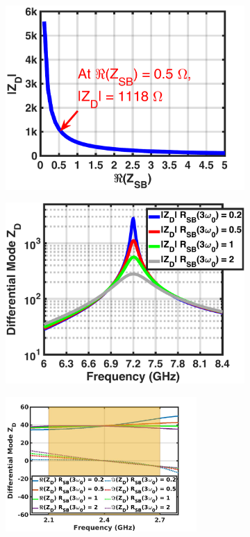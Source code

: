\documentclass[conference]{IEEEtran}
\begin{document}
\begin{figure}[!t]
\captionsetup{font=footnotesize}
\centering
\begin{subfigure}{0.24\textwidth}
\includegraphics[width=1\textwidth]{Images/Design/Design_A_Zn_3H.pdf}
\caption{}
\label{fig:Design_A_Zn_3H}
\end{subfigure}
\begin{subfigure}{0.24\textwidth}
\includegraphics[width=1\textwidth]{Images/Design/Design_A_Rn_var_3H.pdf}
\caption{}
\label{fig:Design_A_Rn_var_3H}
\end{subfigure}
\begin{subfigure}{0.5\textwidth}
\centering
\includegraphics[width=0.8\textwidth]{Images/Design/Design_A_Rn_var_1H.jpg}

\end{subfigure}
\end{figure}
\end{document}
